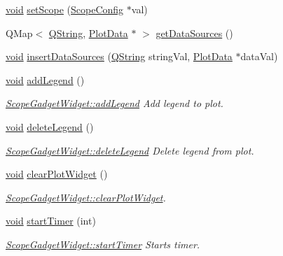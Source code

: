 \begin{DoxyCompactItemize}
\hyperlink{group___u_a_v_objects_plugin_ga444cf2ff3f0ecbe028adce838d373f5c}{void} \hyperlink{group___scope_plugin_gaf7086ffcc7a7a1bbcaac30108908ea19}{set\-Scope} (\hyperlink{class_scope_config}{\-Scope\-Config} $\ast$val)
\item 
\-Q\-Map$<$ \hyperlink{group___u_a_v_objects_plugin_gab9d252f49c333c94a72f97ce3105a32d}{\-Q\-String}, \hyperlink{class_plot_data}{\-Plot\-Data} $\ast$ $>$ \hyperlink{group___scope_plugin_gae23ab8c7b7852bc2ac59639923fb8cfc}{get\-Data\-Sources} ()
\item 
\hyperlink{group___u_a_v_objects_plugin_ga444cf2ff3f0ecbe028adce838d373f5c}{void} \hyperlink{group___scope_plugin_ga4682e74303bf7b117006e3d61a6827ce}{insert\-Data\-Sources} (\hyperlink{group___u_a_v_objects_plugin_gab9d252f49c333c94a72f97ce3105a32d}{\-Q\-String} string\-Val, \hyperlink{class_plot_data}{\-Plot\-Data} $\ast$data\-Val)
\item 
\hyperlink{group___u_a_v_objects_plugin_ga444cf2ff3f0ecbe028adce838d373f5c}{void} \hyperlink{group___scope_plugin_ga3f88f383dc322a2516c1e6b874e341a0}{add\-Legend} ()
\begin{DoxyCompactList}\small\item\em \hyperlink{group___scope_plugin_ga3f88f383dc322a2516c1e6b874e341a0}{\-Scope\-Gadget\-Widget\-::add\-Legend} \-Add legend to plot. \end{DoxyCompactList}\item 
\hyperlink{group___u_a_v_objects_plugin_ga444cf2ff3f0ecbe028adce838d373f5c}{void} \hyperlink{group___scope_plugin_ga16702effa3e6ad5ddf0f94a77e9c430a}{delete\-Legend} ()
\begin{DoxyCompactList}\small\item\em \hyperlink{group___scope_plugin_ga16702effa3e6ad5ddf0f94a77e9c430a}{\-Scope\-Gadget\-Widget\-::delete\-Legend} \-Delete legend from plot. \end{DoxyCompactList}\item 
\hyperlink{group___u_a_v_objects_plugin_ga444cf2ff3f0ecbe028adce838d373f5c}{void} \hyperlink{group___scope_plugin_ga9a19de9754adbab7df27b7db75348346}{clear\-Plot\-Widget} ()
\begin{DoxyCompactList}\small\item\em \hyperlink{group___scope_plugin_ga9a19de9754adbab7df27b7db75348346}{\-Scope\-Gadget\-Widget\-::clear\-Plot\-Widget}. \end{DoxyCompactList}\item 
\hyperlink{group___u_a_v_objects_plugin_ga444cf2ff3f0ecbe028adce838d373f5c}{void} \hyperlink{group___scope_plugin_gaf8b41e32e96d357706a0c2a04d63e40c}{start\-Timer} (int)
\begin{DoxyCompactList}\small\item\em \hyperlink{group___scope_plugin_gaf8b41e32e96d357706a0c2a04d63e40c}{\-Scope\-Gadget\-Widget\-::start\-Timer} \-Starts timer. \end{DoxyCompactList}\end{DoxyCompactItemize}
